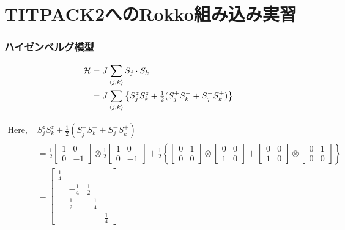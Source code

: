 \section{TITPACK2へのRokko組み込み実習}


\begin{frame}[c,fragile]
  \frametitle{ハイゼンベルグ模型}
\setlength{\fboxsep}{1pt}

\noindent
\begin{align*}
\mathcal{H} &= J \sum\limits_{\langle j,k \rangle} {\boldmath S}_j \cdot S_k \\
&= J \sum\limits_{\langle j,k \rangle} \left\{ S^z_j S^z_k + \tfrac{1}{2}(S^+_j S^-_k + S^-_j S^+_k) \right\}
\end{align*}

\begin{align*}
\text{Here, } & S^z_j S^z_k + \tfrac{1}{2}(S^+_j S^-_k + S^-_j S^+_k) \\
 &=
\tfrac{1}{2}
\begin{bmatrix}
1 & 0 \\
0 & -1
\end{bmatrix}
\otimes
\tfrac{1}{2}
\begin{bmatrix}
1 & 0 \\
0 & -1
\end{bmatrix}
+
\tfrac{1}{2}\left\{
\begin{bmatrix}
0 & 1 \\
0 & 0
\end{bmatrix}
\otimes
\begin{bmatrix}
0 & 0 \\
1 & 0
\end{bmatrix}
+
\begin{bmatrix}
0 & 0 \\
1 & 0
\end{bmatrix}
\otimes
\begin{bmatrix}
0 & 1 \\
0 & 0
\end{bmatrix}
\right\}\\
&=
\begin{bmatrix}
\tfrac{1}{4} & & & \\
 & - \tfrac{1}{4} & \tfrac{1}{2} & \\
 & \tfrac{1}{2} & - \tfrac{1}{4} & \\
 & & & \tfrac{1}{4}
\end{bmatrix}
\end{align*}

\end{frame}


